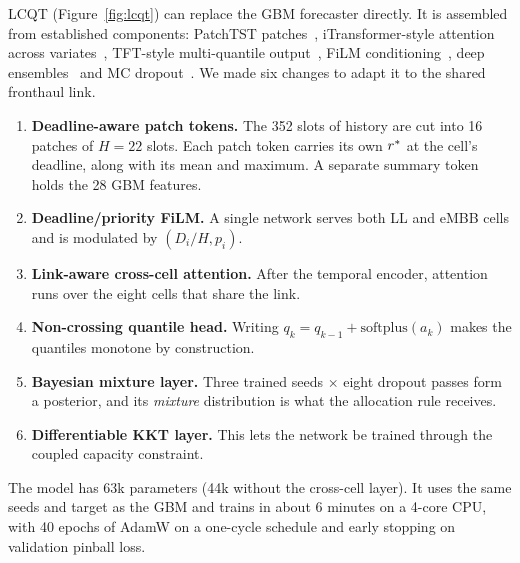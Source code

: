 LCQT (Figure~\ref{fig:lcqt}) can replace the GBM forecaster directly. It is assembled from established components: PatchTST patches~\cite{nie2023}, iTransformer-style attention across variates~\cite{liu2024}, TFT-style multi-quantile output~\cite{lim2021}, FiLM conditioning~\cite{perez2018film}, deep ensembles~\cite{lakshminarayanan2017} and MC dropout~\cite{gal2016}. We made six changes to adapt it to the shared fronthaul link.
\begin{enumerate}
  \item \textbf{Deadline-aware patch tokens.} The 352 slots of history are cut into 16 patches of $H=22$ slots. Each patch token carries its own $r^{\ast}$ at the cell's deadline, along with its mean and maximum. A separate summary token holds the 28 GBM features.
  \item \textbf{Deadline/priority FiLM.} A single network serves both LL and eMBB cells and is modulated by $(D_i/H, p_i)$.
  \item \textbf{Link-aware cross-cell attention.} After the temporal encoder, attention runs over the eight cells that share the link.
  \item \textbf{Non-crossing quantile head.} Writing $q_k = q_{k-1} + \mathrm{softplus}(a_k)$ makes the quantiles monotone by construction.
  \item \textbf{Bayesian mixture layer.} Three trained seeds $\times$ eight dropout passes form a posterior, and its \emph{mixture} distribution is what the allocation rule receives.
  \item \textbf{Differentiable KKT layer.} This lets the network be trained through the coupled capacity constraint.
\end{enumerate}
The model has 63k parameters (44k without the cross-cell layer). It uses the same seeds and target as the GBM and trains in about 6 minutes on a 4-core CPU, with 40 epochs of AdamW on a one-cycle schedule and early stopping on validation pinball loss.

